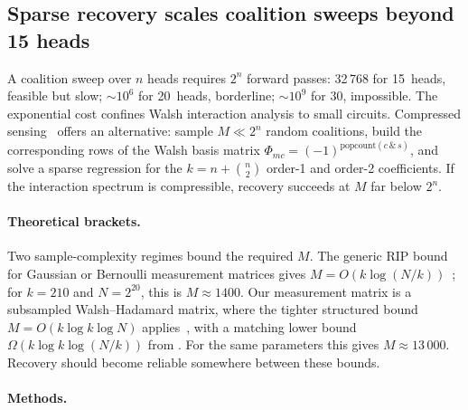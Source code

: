 %
%

\subsection{Sparse recovery scales coalition sweeps beyond 15 heads}
\label{sec:sparse-walsh-recovery}

A coalition sweep over $n$ heads requires $2^n$ forward passes: 32\,768
for 15~heads, feasible but slow; ${\sim}10^6$ for 20~heads, borderline;
${\sim}10^9$ for 30, impossible. The exponential cost confines Walsh
interaction analysis to small circuits.  Compressed
sensing~\citep{candes2005decoding} offers an alternative: sample $M \ll 2^n$
random coalitions, build the corresponding rows of the Walsh basis matrix
$\Phi_{mc} = (-1)^{\mathrm{popcount}(c \,\&\, s)}$, and solve a sparse
regression for the $k = n + \binom{n}{2}$ order-1 and order-2 coefficients.
If the interaction spectrum is compressible, recovery succeeds at $M$
far below $2^n$.

\paragraph{Theoretical brackets.}

Two sample-complexity regimes bound the required $M$. The generic RIP
bound for Gaussian or Bernoulli measurement matrices gives
$M = O(k \log(N/k))$~\citep{candes2005decoding}; for $k=210$ and
$N = 2^{20}$, this is $M \approx 1400$. Our measurement matrix is a
subsampled Walsh--Hadamard matrix, where the tighter structured bound
$M = O(k \log k \log N)$ applies~\citep{bourgain2014,rudelson2008sparse},
with a matching lower bound $\Omega(k \log k \log(N/k))$ from
\citet{blasiok2019sparse}. For the same parameters this gives $M \approx 13\,000$.
Recovery should become reliable somewhere between these bounds.

\paragraph{Methods.}

